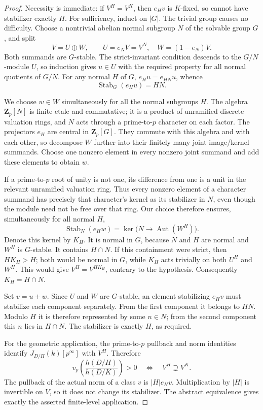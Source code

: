 \begin{proof}
Necessity is immediate: if \(V^H=V^K\), then \(e_Hv\)
is \(K\)-fixed, so cannot have stabilizer exactly \(H\).
For sufficiency, induct on \(|G|\). The trivial group
causes no difficulty. Choose a nontrivial abelian normal
subgroup \(N\) of the solvable group \(G\), and split
\[
                  V=U\oplus W,\qquad
                  U=e_NV=V^N,\quad W=(1-e_N)V.
\]
Both summands are \(G\)-stable. The strict-invariant
condition descends to the \(G/N\)-module \(U\), so induction
gives \(u\in U\) with the required property for all normal
quotients of \(G/N\). For any normal \(H\) of \(G\),
\(e_Hu=e_{HN}u\), whence
\[
                     \operatorname{Stab}_G(e_Hu)=HN.
\]

We choose \(w\in W\) simultaneously for all the normal
subgroups \(H\). The algebra \(\mathbf Z_p[N]\) is finite
etale and commutative; it is a product of unramified
discrete valuation rings, and \(N\) acts through a
prime-to-\(p\) character on each factor. The projectors
\(e_H\) are central in \(\mathbf Z_p[G]\). They commute
with this algebra and with each other, so decompose
\(W\) further into their finitely many joint image/kernel
summands. Choose one nonzero element in every nonzero
joint summand and add these elements to obtain \(w\).

If a prime-to-\(p\) root of unity is not one, its
difference from one is a unit in the relevant
unramified valuation ring. Thus every nonzero element
of a character summand has precisely that character's
kernel as its stabilizer in \(N\), even though the
module need not be free over that ring. Our choice
therefore ensures, simultaneously for all normal \(H\),
\[
 \operatorname{Stab}_N(e_Hw)
       =\ker\bigl(N\longrightarrow
                         \operatorname{Aut}(W^H)\bigr).
\]
Denote this kernel by \(K_H\). It is normal in \(G\),
because \(N\) and \(H\) are normal and \(W^H\) is
\(G\)-stable. It contains \(H\cap N\). If this
containment were strict, then \(HK_H>H\); both would
be normal in \(G\), while \(K_H\) acts trivially on
both \(U^H\) and \(W^H\). This would give
\(V^H=V^{HK_H}\), contrary to the hypothesis.
Consequently \(K_H=H\cap N\).

Set \(v=u+w\). Since \(U\) and \(W\) are \(G\)-stable,
an element stabilizing \(e_Hv\) must stabilize each
component separately. From the first component it
belongs to \(HN\). Modulo \(H\) it is therefore
represented by some \(n\in N\); from the second
component this \(n\) lies in \(H\cap N\).
The stabilizer is exactly \(H\), as required.

For the geometric application, the prime-to-\(p\)
pullback and norm identities identify
\(J_{D/H}(k)[p^\infty]\) with \(V^H\). Therefore
\[
 v_p\!\left(\frac{h(D/H)}{h(D/K)}\right)>0
                  \quad\Longleftrightarrow\quad
                  V^H\supsetneq V^K.
\]
The pullback of the actual norm of a class \(v\)
is \(|H|e_Hv\). Multiplication by \(|H|\) is
invertible on \(V\), so it does not change its
stabilizer. The abstract equivalence gives exactly
the asserted finite-level application.
\end{proof}

